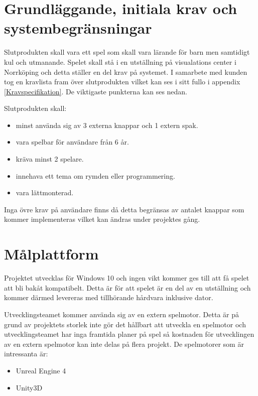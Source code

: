\documentclass[a4paper,12pt,oneside,final]{extbook}
\begin{document}
\section{Grundläggande, initiala krav och systembegränsningar}
Slutprodukten skall vara ett spel som skall vara lärande för barn men samtidigt kul och utmanande. Spelet skall stå i en utställning på visualations center i Norrköping och detta ställer en del krav på systemet. I samarbete med kunden tog en kravlista fram över slutprodukten vilket kan ses i sitt fullo i appendix \ref{Kravspecifikation}. De viktigaste punkterna kan ses nedan.

Slutprodukten skall:
\begin{itemize}
	\item minst använda sig av 3 externa knappar och 1 extern spak.
	\item vara spelbar för användare från 6 år.
	\item kräva minst 2 spelare.
	\item innehava ett tema om rymden eller programmering.
	\item vara lättmonterad.

\end{itemize}

Inga övre krav på användare finns då detta begränsas av antalet knappar som kommer implementeras vilket kan ändras under projektes gång. 

\section{Målplattform}

Projektet utvecklas för Windows 10 och ingen vikt kommer ges till att få spelet att bli bakåt kompatibelt. Detta är för att spelet är en del av en utställning och kommer därmed levereras med tillhörande hårdvara inklusive dator. 

Utvecklingsteamet kommer använda sig av en extern spelmotor. Detta är på grund av projektets storlek inte gör det hållbart att utveckla en spelmotor och utvecklingsteamet har inga framtida planer på spel så kostnaden för utvecklingen av en extern spelmotor kan inte delas på flera projekt. De spelmotorer som är intressanta är:
  
\begin{itemize}
	\item Unreal Engine 4
	\item Unity3D

\end{itemize}
\end{document}
